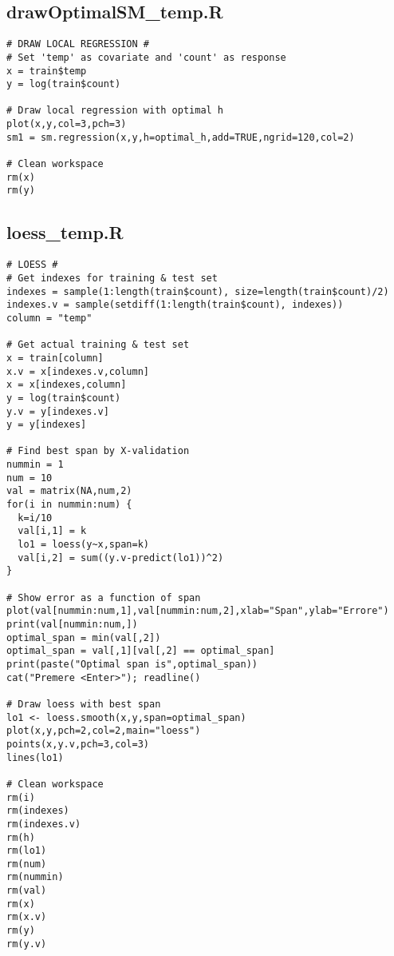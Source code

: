 \subsection{drawOptimalSM\_temp.R}\label{sec:drawSM-temp}
\begin{verbatim}
# DRAW LOCAL REGRESSION #
# Set 'temp' as covariate and 'count' as response
x = train$temp
y = log(train$count)

# Draw local regression with optimal h
plot(x,y,col=3,pch=3)
sm1 = sm.regression(x,y,h=optimal_h,add=TRUE,ngrid=120,col=2)

# Clean workspace
rm(x)
rm(y)
\end{verbatim}

\subsection{loess\_temp.R}\label{sec:loess-temp}
\begin{verbatim}
# LOESS #
# Get indexes for training & test set
indexes = sample(1:length(train$count), size=length(train$count)/2)
indexes.v = sample(setdiff(1:length(train$count), indexes))
column = "temp"

# Get actual training & test set
x = train[column]
x.v = x[indexes.v,column]
x = x[indexes,column]
y = log(train$count)
y.v = y[indexes.v]
y = y[indexes]

# Find best span by X-validation
nummin = 1
num = 10
val = matrix(NA,num,2)
for(i in nummin:num) {
  k=i/10
  val[i,1] = k
  lo1 = loess(y~x,span=k)
  val[i,2] = sum((y.v-predict(lo1))^2)
}

# Show error as a function of span
plot(val[nummin:num,1],val[nummin:num,2],xlab="Span",ylab="Errore")
print(val[nummin:num,])
optimal_span = min(val[,2])
optimal_span = val[,1][val[,2] == optimal_span]
print(paste("Optimal span is",optimal_span))
cat("Premere <Enter>"); readline()

# Draw loess with best span
lo1 <- loess.smooth(x,y,span=optimal_span)
plot(x,y,pch=2,col=2,main="loess")
points(x,y.v,pch=3,col=3)
lines(lo1)

# Clean workspace
rm(i)
rm(indexes)
rm(indexes.v)
rm(h)
rm(lo1)
rm(num)
rm(nummin)
rm(val)
rm(x)
rm(x.v)
rm(y)
rm(y.v)
\end{verbatim}

